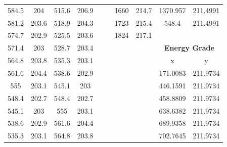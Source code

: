 \begin{center}
\begin{tabular}{|cccc||cccc||cc|}
    584.5    & 204                     & 515.6 & 206.9                        &          &                        & 1660  & 214.7                        & 1370.957 & 211.4991                           \\
    581.2    & 203.6                   & 518.9 & 204.3                        &          &                        & 1723  & 215.4                        & 548.4    & 211.4991                           \\
    574.7    & 202.9                   & 525.5 & 203.6                        &          &                        & 1824  & 217.1                        &          &                                    \\
    571.4    & 203                     & 528.7 & 203.4                        &          &                        &       &                              & \multicolumn{2}{c|}{\textbf{Energy Grade}}    \\ 
    \cline{9-10}
    564.8    & 203.8                   & 535.3 & 203.1                        &          &                        &       &                              & x        & y                                  \\
    561.6    & 204.4                   & 538.6 & 202.9                        &          &                        &       &                              & 171.0083 & 211.9734                           \\
    555      & 203.1                   & 545.1 & 203                          &          &                        &       &                              & 446.1591 & 211.9734                           \\
    548.4    & 202.7                   & 548.4 & 202.7                        &          &                        &       &                              & 458.8809 & 211.9734                           \\
    545.1    & 203                     & 555   & 203.1                        &          &                        &       &                              & 638.6382 & 211.9734                           \\
    538.6    & 202.9                   & 561.6 & 204.4                        &          &                        &       &                              & 689.9358 & 211.9734                           \\
    535.3    & 203.1                   & 564.8 & 203.8                        &          &                        &       &                              & 702.7645 & 211.9734                           \\

\end{tabular}
\end{center}
